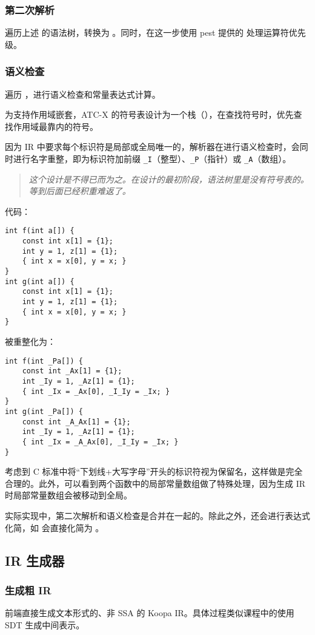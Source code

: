 \subsubsection{第二次解析}
遍历上述  的语法树，转换为 。同时，在这一步使用 pest 提供的  处理运算符优先级。
\subsubsection{语义检查}\label{semantic-checking}
遍历 ，进行语义检查和常量表达式计算。

为支持作用域嵌套，ATC-X 的符号表设计为一个栈（），在查找符号时，优先查找作用域最靠内的符号。

因为 IR 中要求每个标识符是局部或全局唯一的，解析器在进行语义检查时，会同时进行名字重整，即为标识符加前缀 \texttt{\_I}（整型）、\texttt{\_P}（指针）或 \texttt{\_A}（数组）。
\begin{quotation}
    \textit{这个设计是不得已而为之。在设计的最初阶段，语法树里是没有符号表的。等到后面已经积重难返了。}
\end{quotation}

代码：
\begin{verbatim}
int f(int a[]) {
    const int x[1] = {1};
    int y = 1, z[1] = {1};
    { int x = x[0], y = x; }
}
int g(int a[]) {
    const int x[1] = {1};
    int y = 1, z[1] = {1};
    { int x = x[0], y = x; }
}
\end{verbatim}
被重整化为：
\begin{verbatim}
int f(int _Pa[]) {
    const int _Ax[1] = {1};
    int _Iy = 1, _Az[1] = {1};
    { int _Ix = _Ax[0], _I_Iy = _Ix; }
}
int g(int _Pa[]) {
    const int _A_Ax[1] = {1};
    int _Iy = 1, _Az[1] = {1};
    { int _Ix = _A_Ax[0], _I_Iy = _Ix; }
}
\end{verbatim}

考虑到 C 标准中将“下划线+大写字母”开头的标识符视为保留名，这样做是完全合理的。此外，可以看到两个函数中的局部常量数组做了特殊处理，因为生成 IR 时局部常量数组会被移动到全局。

实际实现中，第二次解析和语义检查是合并在一起的。除此之外，还会进行表达式化简，如  会直接化简为 。
\subsection{IR 生成器}
\subsubsection{生成粗 IR}
前端直接生成文本形式的、非 SSA 的 Koopa IR。具体过程类似课程中的使用 SDT 生成中间表示。

